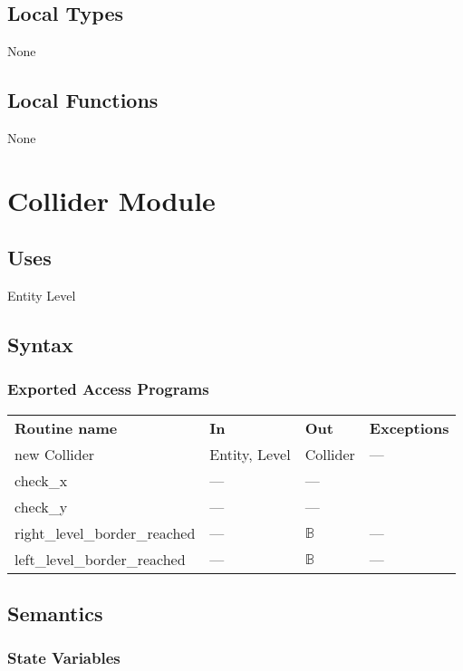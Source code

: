 \documentclass[12pt]{article}
\begin{document}
\subsection* {Local Types}

None

\subsection* {Local Functions}

None

\newpage

\section* {Collider Module}

\subsection* {Uses}
Entity
Level
\subsection* {Syntax}

\subsubsection* {Exported Access Programs}

\begin{tabular}{| l | l | l | l |}
\hline
\textbf{Routine name} & \textbf{In} & \textbf{Out} & \textbf{Exceptions}\\
new Collider & Entity, Level & Collider & ---\\
\hline
check\_x & --- & --- &\\
\hline
check\_y & --- & --- &\\
\hline
right\_level\_border\_reached & --- & $\mathbb{B}$ & ---\\
\hline
left\_level\_border\_reached & --- & $\mathbb{B}$ & ---\\
\hline
\end{tabular}

\subsection* {Semantics}

\subsubsection* {State Variables}
\end{document}
